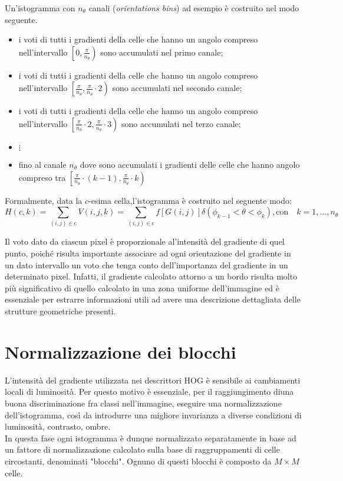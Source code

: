 Un'istogramma con $n_{\theta}$ canali (\emph{orientations bins}) ad esempio è costruito nel modo seguente.
\begin{itemize} 
 \item i voti di tutti i gradienti della celle che hanno un angolo compreso nell'intervallo $\left [0, \frac{\pi}{n_{\theta}}\right )$ sono accumulati nel primo canale;
 \item i voti di tutti i gradienti della celle che hanno un angolo compreso nell'intervallo $\left [\frac{\pi}{n_{\theta}}, \frac{\pi}{n_{\theta}}\cdot 2\right )$ sono accumulati nel secondo canale;
 \item i voti di tutti i gradienti della celle che hanno un angolo compreso nell'intervallo $\left [\frac{\pi}{n_{\theta}}\cdot 2,\frac{\pi}{n_{\theta}}\cdot 3\right )$ sono accumulati nel terzo canale;
 \item[] $\vdots$
 \item fino al canale $n_{\theta}$ dove sono accumulati i gradienti delle celle che hanno angolo compreso tra $\left [\frac{\pi}{n_{\theta}}\cdot {(k-1)},\frac{\pi}{n_{\theta}}\cdot k\right )$
 \end{itemize}
Formalmente, data la $c$-esima cella,l'istogramma è costruito nel seguente modo:
\begin{equation}
\label{eq:}
H(c,k)=\sum_{(i,j)\in\text{c}}V(i,j,k)=\sum_{(i,j)\in\text{c}}f[G(i,j)]\delta(\phi_{k-1}<\theta<\phi_k),  \text{con} \quad k=1,\ldots,n_\theta
\end{equation}

Il voto dato da ciascun pixel è proporzionale al'intensità del gradiente di quel punto, poiché risulta importante associare ad ogni orientazione del gradiente in un dato intervallo un voto che tenga conto dell'importanza del gradiente in un determinato pixel. 
Infatti, il gradiente calcolato attorno a un bordo risulta molto più significativo di quello calcolato in una zona uniforme dell'immagine ed è essenziale per estrarre informazioni utili ad avere una descrizione dettagliata delle strutture geometriche presenti. 

\section{Normalizzazione dei blocchi}
L'intensità del gradiente utilizzata nei descrittori HOG è sensibile ai cambiamenti locali di luminosità.
Per questo motivo è essenziale, per il raggiungimento diuna buona discriminazione fra classi nell'immagine, eseguire una normalizzazione dell'istogramma, così da introdurre una migliore invarianza a diverse condizioni di luminosità, contrasto, ombre.\\
In questa fase ogni istogramma è dunque normalizzato separatamente in base ad un fattore di normalizzazione calcolato sulla base di raggruppamenti di celle circostanti, denominati "blocchi". Ognuno di questi blocchi è composto da $M \times M$ celle.

